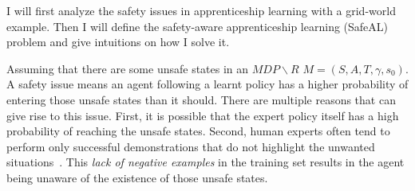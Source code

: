 I will first analyze the safety issues in apprenticeship learning with a grid-world example. Then I will define the safety-aware apprenticeship learning (SafeAL) problem and give intuitions on how I solve it. 


 

Assuming that there are some unsafe states
in an $MDP\backslash R$ $M = (S, A, T, \gamma, s_0)$. 
A safety issue means an agent following a learnt policy has a higher probability of entering those unsafe states than it should. There are multiple reasons that can give rise to this issue. First, it is possible that the expert policy itself has a high probability of reaching the unsafe states. Second, human experts often tend to perform only successful demonstrations that do not highlight the unwanted situations~\cite{shiarlis2016inverse}. This {\it lack of negative examples} in the training set results in the agent being unaware of the existence of those unsafe states.

